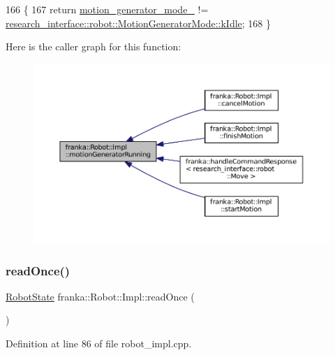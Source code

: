\begin{DoxyCode}
166                                                       \{
167   \textcolor{keywordflow}{return} \hyperlink{classfranka_1_1Robot_1_1Impl_a209c353b4da1c85d3e633cab161a0d39}{motion\_generator\_mode\_} != 
      \hyperlink{namespaceresearch__interface_1_1robot_abd2451eb963a1843f1eb066ebd4b06e8af5137a026a4b2f3b1c8a21cfc60dd14b}{research\_interface::robot::MotionGeneratorMode::kIdle};
168 \}
\end{DoxyCode}
Here is the caller graph for this function\+:
\nopagebreak
\begin{figure}[H]
\begin{center}
\leavevmode
\includegraphics[width=350pt]{classfranka_1_1Robot_1_1Impl_aa6b34693c27b529a52f7ea5a607c7252_icgraph}
\end{center}
\end{figure}
\mbox{\label{classfranka_1_1Robot_1_1Impl_a0de2609b63c0f9ab6bab6e7180c021bf}} 
\subsubsection{\texorpdfstring{read\+Once()}{readOnce()}}
{\footnotesize\ttfamily \hyperlink{structfranka_1_1RobotState}{Robot\+State} franka\+::\+Robot\+::\+Impl\+::read\+Once (\begin{DoxyParamCaption}{ }\end{DoxyParamCaption})}



Definition at line 86 of file robot\+\_\+impl.\+cpp.



